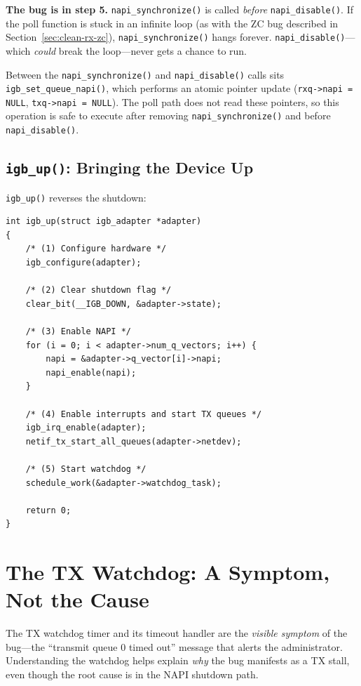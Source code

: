 \documentclass[11pt,a4paper,openany]{book}
\newcommand{\func}[1]{\texttt{#1()}}
\begin{document}
\textbf{The bug is in step 5.}  \func{napi\_synchronize} is called
\emph{before} \func{napi\_disable}.  If the poll function is stuck in an
infinite loop (as with the ZC bug described in
Section~\ref{sec:clean-rx-zc}), \func{napi\_synchronize} hangs forever.
\func{napi\_disable}---which \emph{could} break the loop---never gets
a chance to run.

Between the \func{napi\_synchronize} and \func{napi\_disable} calls sits
\func{igb\_set\_queue\_napi}, which performs an atomic pointer update
(\texttt{rxq->napi = NULL}, \texttt{txq->napi = NULL}).  The poll path
does not read these pointers, so this operation is safe to execute after
removing \func{napi\_synchronize} and before \func{napi\_disable}.

\section{\texttt{igb\_up()}: Bringing the Device Up}
\label{sec:igb-up}

\func{igb\_up} reverses the shutdown:

\begin{lstlisting}[caption={\texttt{igb\_up()} key steps (igb\_main.c:2122)}]
int igb_up(struct igb_adapter *adapter)
{
    /* (1) Configure hardware */
    igb_configure(adapter);

    /* (2) Clear shutdown flag */
    clear_bit(__IGB_DOWN, &adapter->state);

    /* (3) Enable NAPI */
    for (i = 0; i < adapter->num_q_vectors; i++) {
        napi = &adapter->q_vector[i]->napi;
        napi_enable(napi);
    }

    /* (4) Enable interrupts and start TX queues */
    igb_irq_enable(adapter);
    netif_tx_start_all_queues(adapter->netdev);

    /* (5) Start watchdog */
    schedule_work(&adapter->watchdog_task);

    return 0;
}
\end{lstlisting}


\chapter{The TX Watchdog: A Symptom, Not the Cause}
\label{ch:watchdog}

The TX watchdog timer and its timeout handler are the \emph{visible
symptom} of the bug---the ``transmit queue 0 timed out'' message that
alerts the administrator.  Understanding the watchdog helps explain
\emph{why} the bug manifests as a TX stall, even though the root cause
is in the NAPI shutdown path.
\end{document}
